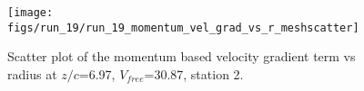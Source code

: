 \begin{figure}[H]
\centering
\texttt{[image: figs/run\_19/run\_19\_momentum\_vel\_grad\_vs\_r\_meshscatter]}
\caption{Scatter plot of the momentum based velocity gradient term vs radius at $z/c$=6.97, $V_{free}$=30.87, station 2.}
\label{fig:run_19_momentum_vel_grad_vs_r_meshscatter}
\end{figure}


